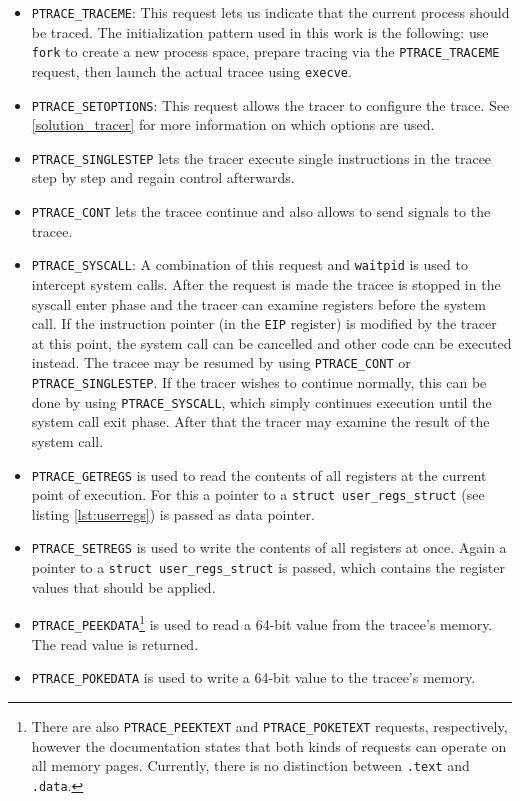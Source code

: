 \documentclass[draft,final]{vutinfth} %
\begin{document}
\begin{itemize}
    \item \texttt{PTRACE\_TRACEME}: This request lets us indicate that the current process should be traced. The initialization pattern used in this work is the following: use \texttt{fork} to create a new process space, prepare tracing via the \texttt{PTRACE\_TRACEME} request, then launch the actual tracee using \texttt{execve}.
    \item \texttt{PTRACE\_SETOPTIONS}: This request allows the tracer to configure the trace. See \ref{solution_tracer} for more information on which options are used.
    \item \texttt{PTRACE\_SINGLESTEP} lets the tracer execute single instructions in the tracee step by step and regain control afterwards.
    \item \texttt{PTRACE\_CONT} lets the tracee continue and also allows to send signals to the tracee.
    \item \texttt{PTRACE\_SYSCALL}: A combination of this request and \texttt{waitpid} is used to intercept system calls. After the request is made the tracee is stopped in the syscall enter phase and the tracer can examine registers before the system call. If the instruction pointer (in the \texttt{EIP} register) is modified by the tracer at this point, the system call can be cancelled and other code can be executed instead. The tracee may be resumed by using \texttt{PTRACE\_CONT} or \texttt{PTRACE\_SINGLESTEP}. If the tracer wishes to continue normally, this can be done by using \texttt{PTRACE\_SYSCALL}, which simply continues execution until the system call exit phase. After that the tracer may examine the result of the system call.
    \item \texttt{PTRACE\_GETREGS} is used to read the contents of all registers at the current point of execution. For this a pointer to a \texttt{struct user\_regs\_struct} (see listing \ref{lst:userregs}) is passed as data pointer.
    \item \texttt{PTRACE\_SETREGS} is used to write the contents of all registers at once. Again a pointer to a \texttt{struct user\_regs\_struct} is passed, which contains the register values that should be applied.
    \item \texttt{PTRACE\_PEEKDATA}\footnote{There are also \texttt{PTRACE\_PEEKTEXT} and \texttt{PTRACE\_POKETEXT} requests, respectively, however the documentation states that both kinds of requests can operate on all memory pages. Currently, there is no distinction between \texttt{.text} and \texttt{.data}.} is used to read a 64-bit value from the tracee's memory. The read value is returned.
    \item \texttt{PTRACE\_POKEDATA} is used to write a 64-bit value to the tracee's memory.
\end{itemize}
\end{document}
